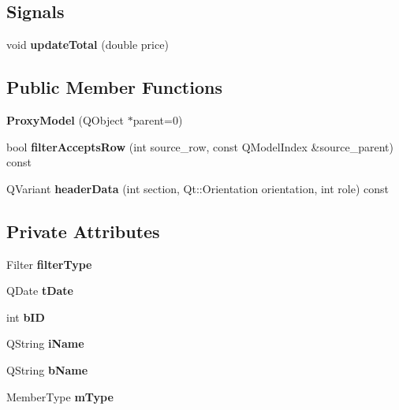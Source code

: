 \subsection*{Signals}
\begin{DoxyCompactItemize}
\item 
\mbox{\label{class_proxy_model_a643b0f70391c4181a27b089f0d41d190}} 
void {\bfseries update\+Total} (double price)
\end{DoxyCompactItemize}
\subsection*{Public Member Functions}
\begin{DoxyCompactItemize}
\item 
\mbox{\label{class_proxy_model_aaf0330aa8b9eaa66cced6a5bb2b12594}} 
{\bfseries Proxy\+Model} (Q\+Object $\ast$parent=0)
\item 
\mbox{\label{class_proxy_model_a1e9a122098418c6e82dd9e34a21f1d0f}} 
bool {\bfseries filter\+Accepts\+Row} (int source\+\_\+row, const Q\+Model\+Index \&source\+\_\+parent) const
\item 
\mbox{\label{class_proxy_model_af81a126c2e3d5222c2bfd6c6643d8fd7}} 
Q\+Variant {\bfseries header\+Data} (int section, Qt\+::\+Orientation orientation, int role) const
\end{DoxyCompactItemize}
\subsection*{Private Attributes}
\begin{DoxyCompactItemize}
\item 
\mbox{\label{class_proxy_model_a4344a1574770f9c7fd17632c09b1d436}} 
Filter {\bfseries filter\+Type}
\item 
\mbox{\label{class_proxy_model_aad65e1f7c525732aae071b0c2d024049}} 
Q\+Date {\bfseries t\+Date}
\item 
\mbox{\label{class_proxy_model_ad12b592896da63b73912d4faf3b02d7c}} 
int {\bfseries b\+ID}
\item 
\mbox{\label{class_proxy_model_a602f932d290e7f58d1d313277ba9c5f5}} 
Q\+String {\bfseries i\+Name}
\item 
\mbox{\label{class_proxy_model_a5b323a26dfe4ab7c375ad6142a0a9e48}} 
Q\+String {\bfseries b\+Name}
\item 
\mbox{\label{class_proxy_model_ae21e40b3803656450588ce6102c7be1b}} 
Member\+Type {\bfseries m\+Type}
\end{DoxyCompactItemize}


